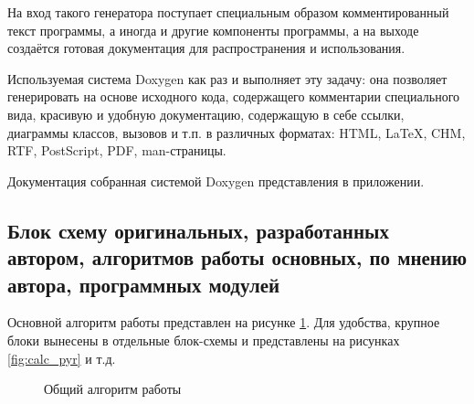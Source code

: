 На вход такого генератора поступает специальным образом комментированный текст программы, а иногда и другие компоненты программы, а на выходе создаётся готовая документация для распространения и использования.

Используемая система Doxygen как раз и выполняет эту задачу: она позволяет генерировать на основе исходного кода, содержащего комментарии специального вида, красивую и удобную документацию, содержащую в себе ссылки, диаграммы классов, вызовов и т.п. в различных форматах: HTML, LaTeX, CHM, RTF, PostScript, PDF, man-страницы.

Документация собранная системой Doxygen представления в приложении.
\subsection{Блок схему оригинальных, разработанных автором, алгоритмов работы основных, по мнению автора, программных модулей}
Основной алгоритм работы представлен на рисунке \ref{fig:lucas_kanade_alg}. Для удобства, крупное блоки вынесены в отдельные блок-схемы и представлены на рисунках \ref{fig:calc_pyr} и т.д. 
\begin{figure}
\caption{Общий алгоритм работы}
\label{fig:lucas_kanade_alg}
\end{figure}

